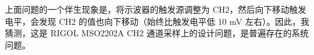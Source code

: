 \documentclass[UTF8]{article}
\begin{document}
上面问题的一个伴生现象是，将示波器的触发源调整为 CH2，然后向下移动触发电平，会发现 CH2 的值也向下移动（始终比触发电平低 10 mV 左右）。因此，我猜测，这是 RIGOL MSO2202A CH2 通道采样上的设计问题，是普遍存在的系统问题。
\end{document}
